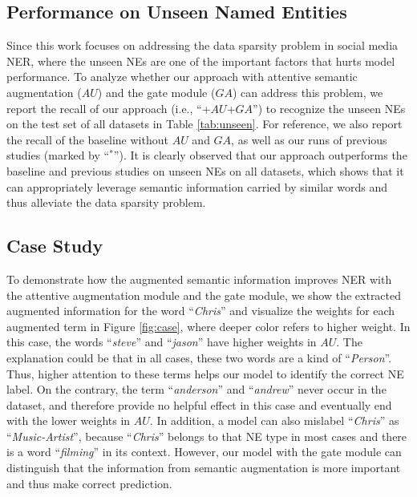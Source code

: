 \documentclass[11pt,a4paper]{article}
\begin{document}
\subsection{Performance on Unseen Named Entities}





Since this work focuses on addressing the data sparsity problem in social media NER, where the unseen NEs
are one of the important factors that hurts model performance.
To analyze whether our approach with attentive semantic augmentation ($AU$) and the gate module ($GA$) can address this problem, we report the recall of our approach (i.e., ``+$AU$+$GA$'') to recognize the unseen NEs on the test set of all datasets in Table \ref{tab:unseen}.
For reference, we also report the recall of the baseline without $AU$ and $GA$, as well as our runs of previous studies (marked by ``$^*$'').
It is clearly observed that our approach outperforms the baseline and previous studies on unseen NEs on all datasets, which shows that it can appropriately leverage semantic information carried by similar words and thus alleviate the data sparsity problem. 





\subsection{Case Study}


To demonstrate how the augmented semantic information improves NER with the attentive augmentation module and the gate module, 
we show the extracted augmented information for the word ``\textit{Chris}'' and visualize the weights for each augmented term in
Figure \ref{fig:case}, where deeper color refers to higher weight.
In this case, the words ``\textit{steve}'' and ``\textit{jason}'' have higher weights in ${AU}$.
The explanation could be that in all cases, these two words are a kind of ``\textit{Person}''. 
Thus, higher attention to these terms helps our model to identify the correct NE label. 
On the contrary, the term ``\textit{anderson}'' and ``\textit{andrew}'' never occur in the dataset, and therefore provide no helpful effect in this case and eventually end with the lower weights in ${AU}$. 
In addition, a model can also mislabel ``\textit{Chris}'' as ``\textit{Music-Artist}'', because ``\textit{Chris}'' belongs to that NE type in most cases and there is a word ``\textit{filming}'' in its context.
However, our model with the gate module can distinguish that the information from semantic augmentation is more important and thus make correct prediction.
\end{document}
